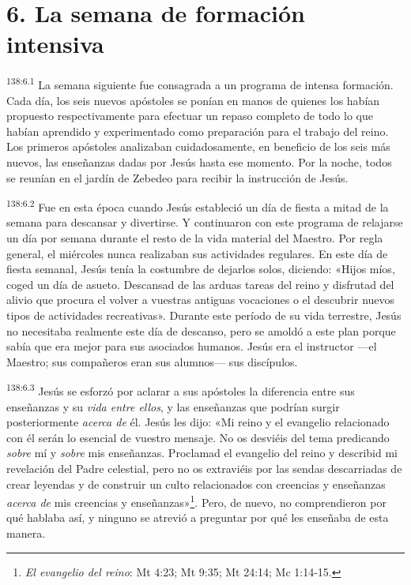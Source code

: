 \section*{6. La semana de formación intensiva}
\par
\textsuperscript{138:6.1} La semana siguiente fue consagrada a un programa de intensa formación. Cada día, los seis nuevos apóstoles se ponían en manos de quienes los habían propuesto respectivamente para efectuar un repaso completo de todo lo que habían aprendido y experimentado como preparación para el trabajo del reino. Los primeros apóstoles analizaban cuidadosamente, en beneficio de los seis más nuevos, las enseñanzas dadas por Jesús hasta ese momento. Por la noche, todos se reunían en el jardín de Zebedeo para recibir la instrucción de Jesús.

\par
\textsuperscript{138:6.2} Fue en esta época cuando Jesús estableció un día de fiesta a mitad de la semana para descansar y divertirse. Y continuaron con este programa de relajarse un día por semana durante el resto de la vida material del Maestro. Por regla general, el miércoles nunca realizaban sus actividades regulares. En este día de fiesta semanal, Jesús tenía la costumbre de dejarlos solos, diciendo: «Hijos míos, coged un día de asueto. Descansad de las arduas tareas del reino y disfrutad del alivio que procura el volver a vuestras antiguas vocaciones o el descubrir nuevos tipos de actividades recreativas». Durante este período de su vida terrestre, Jesús no necesitaba realmente este día de descanso, pero se amoldó a este plan porque sabía que era mejor para sus asociados humanos. Jesús era el instructor ---el Maestro; sus compañeros eran sus alumnos--- sus discípulos.

\par
\textsuperscript{138:6.3} Jesús se esforzó por aclarar a sus apóstoles la diferencia entre sus enseñanzas y su \textit{vida entre ellos}, y las enseñanzas que podrían surgir posteriormente \textit{acerca de} él. Jesús les dijo: «Mi reino y el evangelio relacionado con él serán lo esencial de vuestro mensaje. No os desviéis del tema predicando \textit{sobre} mí y \textit{sobre} mis enseñanzas. Proclamad el evangelio del reino y describid mi revelación del Padre celestial, pero no os extraviéis por las sendas descarriadas de crear leyendas y de construir un culto relacionados con creencias y enseñanzas \textit{acerca de} mis creencias y enseñanzas»\footnote{\textit{El evangelio del reino}: Mt 4:23; Mt 9:35; Mt 24:14; Mc 1:14-15.}. Pero, de nuevo, no comprendieron por qué hablaba así, y ninguno se atrevió a preguntar por qué les enseñaba de esta manera.

